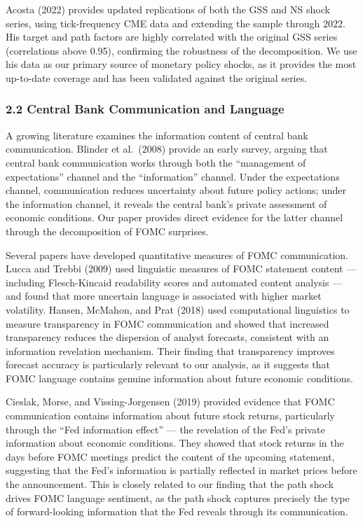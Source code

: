 \documentclass[12pt]{article}
\begin{document}
Acosta (2022) provides updated replications of both the GSS and NS shock
series, using tick-frequency CME data and extending the sample through
2022. His target and path factors are highly correlated with the
original GSS series (correlations above 0.95), confirming the robustness
of the decomposition. We use his data as our primary source of monetary
policy shocks, as it provides the most up-to-date coverage and has been
validated against the original series.

\subsubsection{2.2 Central Bank Communication and
Language}\label{central-bank-communication-and-language}

A growing literature examines the information content of central bank
communication. Blinder et al.~(2008) provide an early survey, arguing
that central bank communication works through both the ``management of
expectations'' channel and the ``information'' channel. Under the
expectations channel, communication reduces uncertainty about future
policy actions; under the information channel, it reveals the central
bank's private assessment of economic conditions. Our paper provides
direct evidence for the latter channel through the decomposition of FOMC
surprises.

Several papers have developed quantitative measures of FOMC
communication. Lucca and Trebbi (2009) used linguistic measures of FOMC
statement content --- including Flesch-Kincaid readability scores and
automated content analysis --- and found that more uncertain language is
associated with higher market volatility. Hansen, McMahon, and Prat
(2018) used computational linguistics to measure transparency in FOMC
communication and showed that increased transparency reduces the
dispersion of analyst forecasts, consistent with an information
revelation mechanism. Their finding that transparency improves forecast
accuracy is particularly relevant to our analysis, as it suggests that
FOMC language contains genuine information about future economic
conditions.

Cieslak, Morse, and Vissing-Jorgensen (2019) provided evidence that FOMC
communication contains information about future stock returns,
particularly through the ``Fed information effect'' --- the revelation
of the Fed's private information about economic conditions. They showed
that stock returns in the days before FOMC meetings predict the content
of the upcoming statement, suggesting that the Fed's information is
partially reflected in market prices before the announcement. This is
closely related to our finding that the path shock drives FOMC language
sentiment, as the path shock captures precisely the type of
forward-looking information that the Fed reveals through its
communication.
\end{document}
